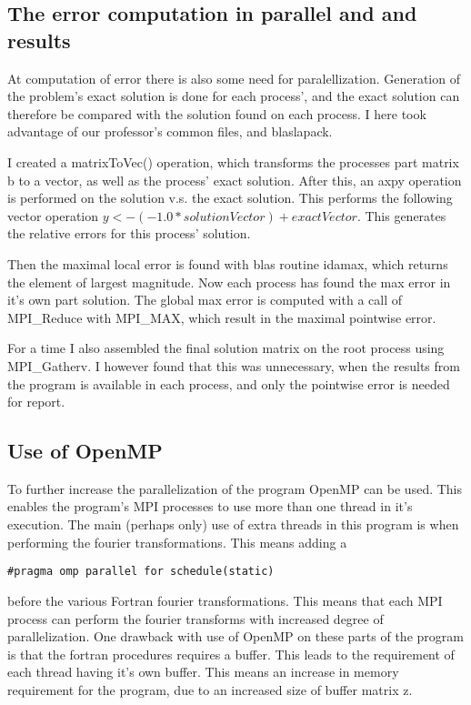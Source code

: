 \subsection{The error computation in parallel and and results}
At computation of error there is also some need for paralellization. Generation of the problem's exact solution is done for each process', and the exact solution can therefore be compared with the solution found on each process. I here took advantage of our professor's common files, and blaslapack. 

I created a matrixToVec() operation, which transforms the processes part matrix b to a vector, as well as the process' exact solution. After this, an axpy operation is performed on the solution v.s. the exact solution. This performs the following vector operation $y <- (-1.0*solutionVector) + exactVector$. This generates the relative errors for this process' solution. 

Then the maximal local error is found with blas routine idamax, which returns the element of largest magnitude. Now each process has found the max error in it's own part solution. The global max error is computed with a call of MPI\_Reduce with MPI\_MAX, which result in the maximal pointwise error.

For a time I also assembled the final solution matrix on the root process using MPI\_Gatherv. I however found that this was unnecessary, when the results from the program is available in each process, and only the pointwise error is needed for report. 

\subsection{Use of OpenMP}
To further increase the parallelization of the program OpenMP can be used. This enables the program's MPI processes to use more than one thread in it's execution. 
The main (perhaps only) use of extra threads in this program is when performing the fourier transformations. This means adding a 
\begin{lstlisting}
#pragma omp parallel for schedule(static)
\end{lstlisting}
before the various Fortran fourier transformations. This means that each MPI process can perform the fourier transforms with increased degree of parallelization. One drawback with use of OpenMP on these parts of the program is that the fortran procedures requires a buffer. This leads to the requirement of each thread having it's own buffer. This means an increase in memory requirement for the program, due to an increased size of buffer matrix z.

